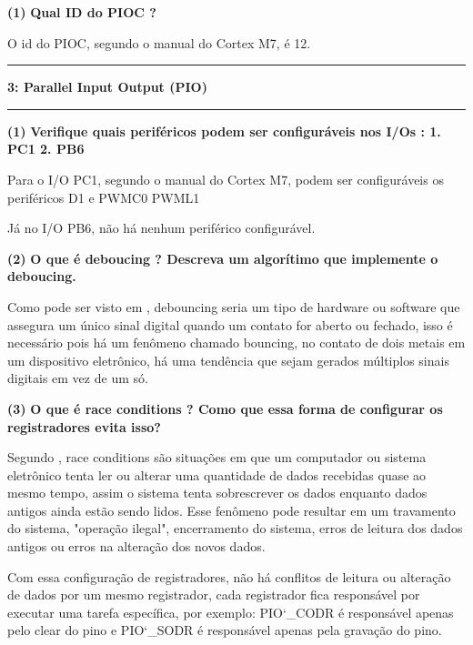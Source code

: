 \documentclass[11pt]{article}
\newcommand\question[2]{\vspace{.25in}\hrule\textbf{#1: #2}\vspace{.5em}\hrule\vspace{.10in}}
\renewcommand\part[1]{\vspace{.10in}\textbf{(#1)}}
\newcommand\piod{\vspace{.10in}\textbf{Qual ID do PIOC ?}}
\newcommand\pioperiferico{\vspace{.10in}\textbf{Verifique quais periféricos podem ser configuráveis nos I/Os
		:
		1. PC1
		2. PB6}}
\newcommand\debouncing{\vspace{.10in}\textbf{O que é deboucing ? Descreva um algorítimo que implemente o deboucing.}}
\newcommand\race{\vspace{.10in}\textbf{O que é race conditions ? Como que essa forma de configurar os registradores
		evita isso?}}
\begin{document}
\raggedright
\part{1}
\piod

\RaggedRight
O id do PIOC, segundo o manual do Cortex M7, é 12.

\raggedright
\question{3}{Parallel Input Output (PIO)}

\raggedright
\part{1}
\pioperiferico

\RaggedRight
Para o I/O PC1, segundo o manual do Cortex M7, podem ser configuráveis os periféricos D1 e PWMC0 PWML1 

Já no I/O PB6, não há nenhum periférico configurável.

\raggedright
\part{2}
\debouncing

\RaggedRight
Como pode ser visto em \cite{debouncing}, debouncing seria um tipo de hardware ou software que assegura um único sinal digital quando um contato for aberto ou fechado, isso é necessário pois há um fenômeno chamado bouncing, no contato de dois metais em um dispositivo eletrônico, há uma tendência que sejam gerados múltiplos sinais digitais em vez de um só.

\raggedright
\part{3}
\race

\RaggedRight
Segundo \cite{race_condition}, race conditions são situações em que um computador ou sistema eletrônico tenta ler ou alterar uma quantidade de dados recebidas quase ao mesmo tempo, assim o sistema tenta sobrescrever os dados enquanto dados antigos ainda estão sendo lidos. Esse fenômeno pode resultar em um travamento do sistema, "operação ilegal", encerramento do sistema, erros de leitura dos dados antigos ou erros na alteração dos novos dados.

Com essa configuração de registradores, não há conflitos de leitura ou alteração de dados por um mesmo registrador, cada registrador fica responsável por executar uma tarefa específica, por exemplo: PIO\char`_CODR é responsável apenas pelo clear do pino e PIO\char`_SODR é responsável apenas pela gravação do pino.
\end{document}

